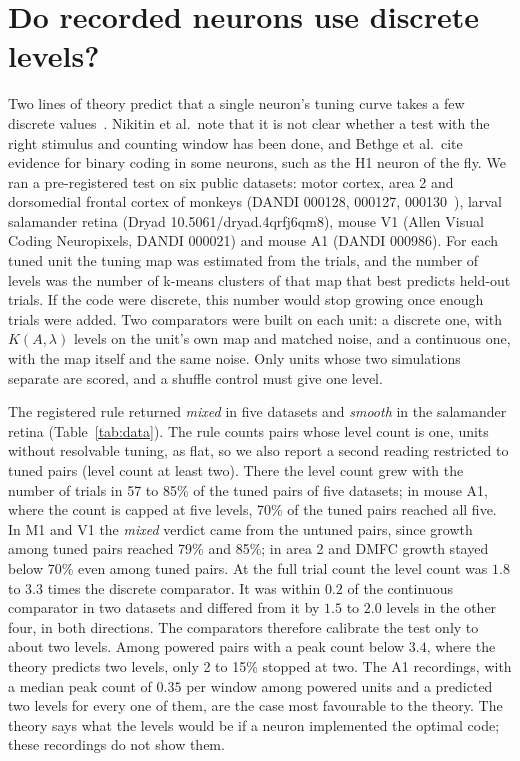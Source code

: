 \documentclass[journal]{IEEEtran}
\begin{document}
\section{Do recorded neurons use discrete levels?}\label{sec:data}
Two lines of theory predict that a single neuron's tuning curve takes a few discrete values~\cite{Bethge2003,Nikitin2009}. Nikitin
et al.\ note that it is not clear whether a test with the right stimulus and counting window has been done, and Bethge et al.\ cite
evidence for binary coding in some neurons, such as the H1 neuron of the fly. We ran a pre-registered test on six public datasets: motor cortex, area 2 and dorsomedial frontal
cortex of monkeys (DANDI 000128, 000127, 000130~\cite{Pei2021}), larval salamander retina (Dryad 10.5061/dryad.4qrfj6qm8), mouse V1
(Allen Visual Coding Neuropixels, DANDI 000021) and mouse A1 (DANDI 000986). For each tuned unit the tuning map was estimated from the
trials, and the number of levels was the number of k-means clusters of that map that best predicts held-out trials. If the code were
discrete, this number would stop growing once enough trials were added. Two comparators were built on each unit: a discrete one, with
$K(A, \lambda)$ levels on the unit's own map and matched noise, and a continuous one, with the map itself and the same noise. Only
units whose two simulations separate are scored, and a shuffle control must give one level.

The registered rule returned \emph{mixed} in five datasets and \emph{smooth} in the salamander retina (Table~\ref{tab:data}). The rule
counts pairs whose level count is one, units without resolvable tuning, as flat, so we also report a second reading restricted to tuned
pairs (level count at least two). There the level count grew with the number of trials in 57 to 85\% of the tuned pairs of five
datasets; in mouse A1, where the count is capped at five levels, 70\% of the tuned pairs reached all five. In M1 and V1 the
\emph{mixed} verdict came from the untuned pairs, since growth among tuned pairs reached 79\% and 85\%; in area 2 and DMFC growth stayed
below 70\% even among tuned pairs. At the full trial count the level count was $1.8$ to $3.3$ times the discrete comparator. It was
within $0.2$ of the continuous comparator in two datasets and differed from it by $1.5$ to $2.0$ levels in the other four, in both
directions. The comparators therefore calibrate the test only to about two levels. Among powered pairs with a peak count below $3.4$, where the
theory predicts two levels, only 2 to 15\% stopped at two. The A1 recordings, with a median peak count of $0.35$ per window among
powered units and a predicted two levels for every one of them, are the case most favourable to the theory. The theory says what the
levels would be if a neuron implemented the optimal code; these recordings do not show them.
\end{document}

